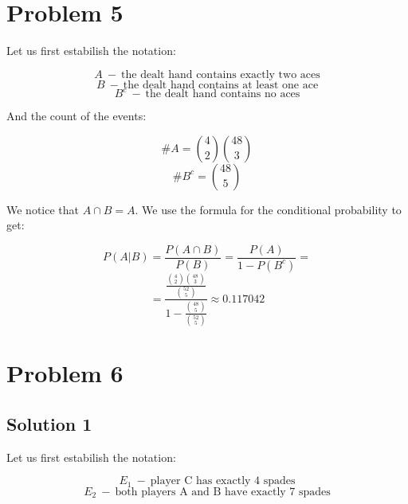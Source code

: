 \documentclass{article}
\begin{document}
\section*{Problem 5}
Let us first estabilish the notation:

\begin{equation*}
    A \ - \ \mbox{the dealt hand contains exactly two aces}
\end{equation*}
\begin{equation*}
    B \ - \ \mbox{the dealt hand contains at least one ace}
\end{equation*}
\begin{equation*}
    B^c \ - \ \mbox{the dealt hand contains no aces}
\end{equation*}

And the count of the events:

\begin{equation*}
    \# A = \binom{4}{2} \binom{48}{3}
\end{equation*}
\begin{equation*}
    \# B^c = \binom{48}{5}
\end{equation*}

We notice that \(A \cap B = A\). We use the formula for the conditional probability to get:

\begin{equation*}
    P(A|B) = \frac{P(A \cap B)}{P(B)} = \frac{P(A)}{1 - P(B^c)} = 
\end{equation*}
\begin{equation*}
    = \frac{\frac{\binom{4}{2} \binom{48}{3}}{\binom{52}{5}}}{1 - \frac{\binom{48}{5}}{\binom{52}{5}}} \approx 0.117042
\end{equation*}

\section*{Problem 6}
\subsection*{Solution 1}
Let us first estabilish the notation:

\begin{equation*}
    E_1 \ - \ \mbox{player C has exactly 4 spades}
\end{equation*}
\begin{equation*}
    E_2 \ - \ \mbox{both players A and B have exactly 7 spades}
\end{equation*}
\end{document}

